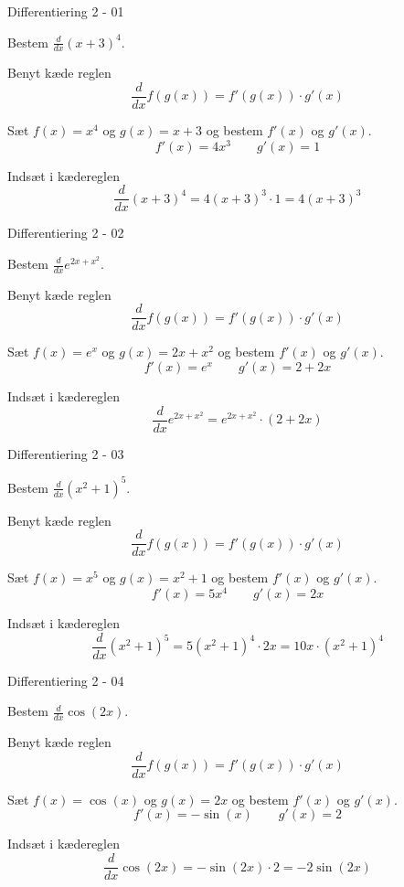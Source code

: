 \documentclass{article}
\begin{document}
\tableofcontents
\newpage

\begin{exercise}{Differentiering 2 - 01}

Bestem $\frac{d}{dx} (x + 3)^4$.


\hint
Benyt kæde reglen
\[
\frac{d}{dx} f(g(x)) = f'(g(x)) \cdot g'(x)
\]

\hint
Sæt $f(x) = x^4$ og $g(x) = x + 3$ og bestem $f'(x)$ og $g'(x)$.
\[
f'(x) = 4 x^3 \qquad g'(x) = 1
\]

\hint
Indsæt i kædereglen
\[
\frac{d}{dx} (x + 3)^4 = 4 (x + 3)^3 \cdot 1 = 4 (x + 3)^3
\]

\end{exercise}

\begin{exercise}{Differentiering 2 - 02}

Bestem $\frac{d}{dx} e^{2x + x^2}$.


\hint
Benyt kæde reglen
\[
\frac{d}{dx} f(g(x)) = f'(g(x)) \cdot g'(x)
\]

\hint
Sæt $f(x) = e^x$ og $g(x) = 2x + x^2$ og bestem $f'(x)$ og $g'(x)$.
\[
f'(x) = e^x \qquad g'(x) = 2 + 2x
\]

\hint
Indsæt i kædereglen
\[
\frac{d}{dx} e^{2x + x^2} = e^{2x + x^2} \cdot (2 + 2x)
\]

\end{exercise}

\begin{exercise}{Differentiering 2 - 03}
	
	Bestem $\frac{d}{dx} \left(x^2 + 1	\right)^5 $.
	
	
	\hint
	Benyt kæde reglen
	\[
	\frac{d}{dx} f(g(x)) = f'(g(x)) \cdot g'(x)
	\]
	
	\hint
	Sæt $f(x) = x^5$ og $g(x) = x^2 + 1$ og bestem $f'(x)$ og $g'(x)$.
	\[
	f'(x) = 5x^4  \qquad g'(x) = 2x
	\]
	
	\hint
	Indsæt i kædereglen
	\[
	\frac{d}{dx} \left(x^2 + 1 \right)^5 = 5 \left(x^2 + 1 \right)^4 \cdot 2x = 10 x \cdot \left(x^2 + 1 \right)^4
	\]
	
\end{exercise}

\begin{exercise}{Differentiering 2 - 04}
	
	Bestem $\frac{d}{dx} \cos(2x)$.
	
	
	\hint
	Benyt kæde reglen
	\[
	\frac{d}{dx} f(g(x)) = f'(g(x)) \cdot g'(x)
	\]
	
	\hint
	Sæt $f(x) = \cos(x)$ og $g(x) = 2x$ og bestem $f'(x)$ og $g'(x)$.
	\[
	f'(x) = - \sin(x) \qquad g'(x) = 2
	\]
	
	\hint
	Indsæt i kædereglen
	\[
	\frac{d}{dx} \cos(2x) = -\sin(2x) \cdot 2 = -2 \sin(2x)
	\]
	
\end{exercise}
\end{document}
